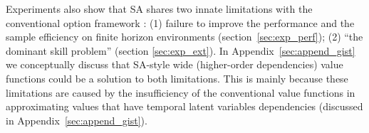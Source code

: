 Experiments also show that SA shares two innate limitations with
the conventional option framework
\cite{levy2011unified,klissarov2017learnings,smith2018inference,harb2018waiting,zhang2019dac}:
(1) failure to improve the performance and the sample efficiency
on finite horizon environments (section~\ref{sec:exp_perf}); (2)
``the dominant skill problem'' \cite{zhang2019dac} (section
\ref{sec:exp_ext}). In Appendix~\ref{sec:append_gist} we
conceptually discuss that SA-style wide (higher-order
dependencies) value functions could be a solution to both
limitations. This is mainly because these limitations are caused
by the insufficiency of the conventional value functions in
approximating values that have temporal latent variables
dependencies (discussed in Appendix~\ref{sec:append_gist}).



